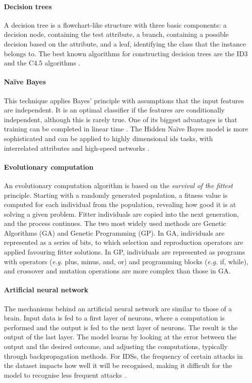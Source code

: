 \paragraph{Decision trees}
A decision tree is a flowchart-like structure with three basic components: a decision node, containing the test attribute, a branch, containing a possible decision based on the attribute, and a leaf, identifying the class that the instance belongs to. The best known algorithms for constructing decision trees are the ID3 and the C4.5 algorithms \citep{Badr2014, Buczak2016}.

\paragraph{Naïve Bayes}
This technique applies Bayes' principle with assumptions that the input features are independent. It is an optimal classifier if the features are conditionally independent, although this is rarely true. One of its biggest advantages is that training can be completed in linear time \citep{Buczak2016}. The Hidden Naïve Bayes model is more sophisticated and can be applied to highly dimensional \gls{ids} tasks, with interrelated attributes and high-speed networks \citep{Khraisat2019}.

\paragraph{Evolutionary computation}
An evolutionary computation algorithm is based on the \emph{survival of the fittest} principle. Starting with a randomly generated population, a fitness value is computed for each individual from the population, revealing how good it is at solving a given problem. Fitter individuals are copied into the next generation, and the process continues. The two most widely used methods are Genetic Algorithms (GA) and Genetic Programming (GP). In GA, individuals are represented as a series of bits, to which selection and reproduction operators are applied favouring fitter solutions. In GP, individuals are represented as programs with operators (\textit{e.g.} plus, minus, and, or) and programming blocks (\textit{e.g.} if, while), and crossover and mutation operations are more complex than those in GA.

\paragraph{Artificial neural network}
The mechanisms behind an artificial neural network are similar to those of a brain. Input data is fed to a first layer of neurons, where a computation is performed and the output is fed to the next layer of neurons. The result is the output of the last layer. The model learns by looking at the error between the output and the desired outcome, and adjusting the computations, typically through backpropagation methods. For IDSs, the frequency of certain attacks in the dataset impacts how well it will be recognised, making it difficult for the model to recognise less frequent attacks \citep{Khraisat2019}.

